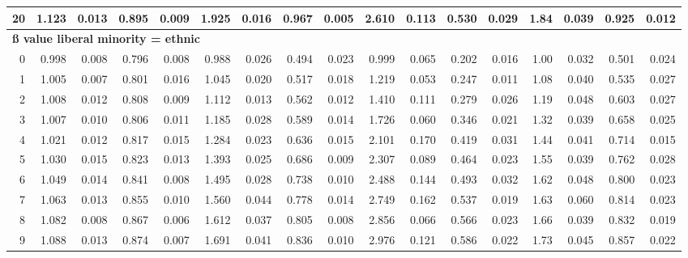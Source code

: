 \documentclass[
]{article}
\begin{document}
\begin{table}[H]
{\begin{tabular}[t]{r|r|r|r|r|r|r|r|r|r|r|r|r|r|r|r|r}
\hline
\hspace{1em}20 & 1.123 & 0.013 & 0.895 & 0.009 & 1.925 & 0.016 & 0.967 & 0.005 & 2.610 & 0.113 & 0.530 & 0.029 & 1.84 & 0.039 & 0.925 & 0.012\\
\hline
\multicolumn{17}{l}{\textbf{ß value liberal minority = ethnic}}\\
\hline
\hspace{1em}0 & 0.998 & 0.008 & 0.796 & 0.008 & 0.988 & 0.026 & 0.494 & 0.023 & 0.999 & 0.065 & 0.202 & 0.016 & 1.00 & 0.032 & 0.501 & 0.024\\
\hline
\hspace{1em}1 & 1.005 & 0.007 & 0.801 & 0.016 & 1.045 & 0.020 & 0.517 & 0.018 & 1.219 & 0.053 & 0.247 & 0.011 & 1.08 & 0.040 & 0.535 & 0.027\\
\hline
\hspace{1em}2 & 1.008 & 0.012 & 0.808 & 0.009 & 1.112 & 0.013 & 0.562 & 0.012 & 1.410 & 0.111 & 0.279 & 0.026 & 1.19 & 0.048 & 0.603 & 0.027\\
\hline
\hspace{1em}3 & 1.007 & 0.010 & 0.806 & 0.011 & 1.185 & 0.028 & 0.589 & 0.014 & 1.726 & 0.060 & 0.346 & 0.021 & 1.32 & 0.039 & 0.658 & 0.025\\
\hline
\hspace{1em}4 & 1.021 & 0.012 & 0.817 & 0.015 & 1.284 & 0.023 & 0.636 & 0.015 & 2.101 & 0.170 & 0.419 & 0.031 & 1.44 & 0.041 & 0.714 & 0.015\\
\hline
\hspace{1em}5 & 1.030 & 0.015 & 0.823 & 0.013 & 1.393 & 0.025 & 0.686 & 0.009 & 2.307 & 0.089 & 0.464 & 0.023 & 1.55 & 0.039 & 0.762 & 0.028\\
\hline
\hspace{1em}6 & 1.049 & 0.014 & 0.841 & 0.008 & 1.495 & 0.028 & 0.738 & 0.010 & 2.488 & 0.144 & 0.493 & 0.032 & 1.62 & 0.048 & 0.800 & 0.023\\
\hline
\hspace{1em}7 & 1.063 & 0.013 & 0.855 & 0.010 & 1.560 & 0.044 & 0.778 & 0.014 & 2.749 & 0.162 & 0.537 & 0.019 & 1.63 & 0.060 & 0.814 & 0.023\\
\hline
\hspace{1em}8 & 1.082 & 0.008 & 0.867 & 0.006 & 1.612 & 0.037 & 0.805 & 0.008 & 2.856 & 0.066 & 0.566 & 0.023 & 1.66 & 0.039 & 0.832 & 0.019\\
\hline
\hspace{1em}9 & 1.088 & 0.013 & 0.874 & 0.007 & 1.691 & 0.041 & 0.836 & 0.010 & 2.976 & 0.121 & 0.586 & 0.022 & 1.73 & 0.045 & 0.857 & 0.022\\

\end{tabular}}
\end{table}
\end{document}
